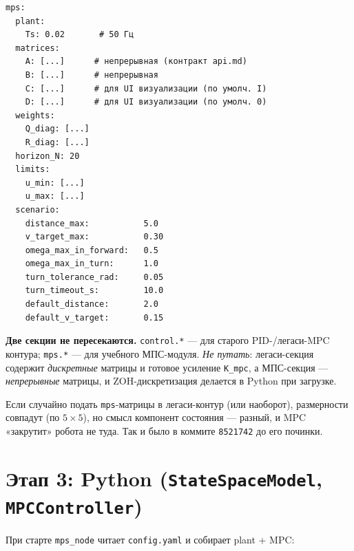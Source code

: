 \begin{codebox}[title={\filepath{config.yaml}, секция \texttt{mps} (учебная)}]
\begin{verbatim}
mps:
  plant:
    Ts: 0.02       # 50 Гц
  matrices:
    A: [...]      # непрерывная (контракт api.md)
    B: [...]      # непрерывная
    C: [...]      # для UI визуализации (по умолч. I)
    D: [...]      # для UI визуализации (по умолч. 0)
  weights:
    Q_diag: [...]
    R_diag: [...]
  horizon_N: 20
  limits:
    u_min: [...]
    u_max: [...]
  scenario:
    distance_max:           5.0
    v_target_max:           0.30
    omega_max_in_forward:   0.5
    omega_max_in_turn:      1.0
    turn_tolerance_rad:     0.05
    turn_timeout_s:         10.0
    default_distance:       2.0
    default_v_target:       0.15
\end{verbatim}
\end{codebox}

\begin{warnbox}
\textbf{Две секции не пересекаются.} \texttt{control.*} --- для старого
PID-/легаси-MPC контура; \texttt{mps.*} --- для учебного МПС-модуля.
\emph{Не путать}: легаси-секция содержит \emph{дискретные} матрицы и
готовое усиление \texttt{K\_mpc}, а МПС-секция --- \emph{непрерывные}
матрицы, и ZOH-дискретизация делается в Python при загрузке.

Если случайно подать \texttt{mps}-матрицы в легаси-контур (или наоборот),
размерности совпадут (по $5\times 5$), но смысл компонент состояния --- разный,
и MPC «закрутит» робота не туда. Так и было в коммите \texttt{8521742}
до его починки.
\end{warnbox}

\section{Этап 3: Python (\texttt{StateSpaceModel}, \texttt{MPCController})}

При старте \texttt{mps\_node} читает \texttt{config.yaml} и собирает
plant + MPC:

